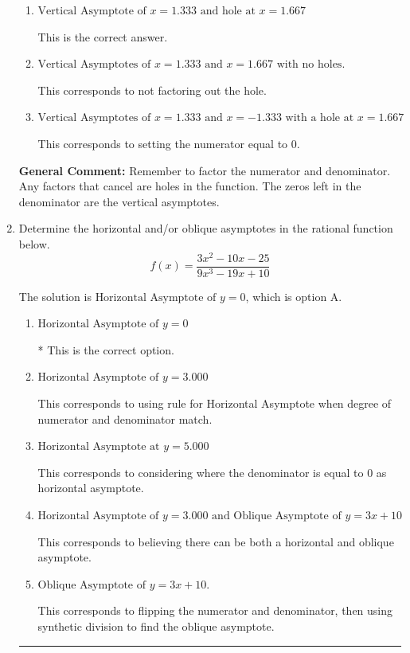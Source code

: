\documentclass{extbook}[14pt]
\newcommand{\litem}[1]{\item #1

\rule{\textwidth}{0.4pt}}
\begin{document}
\begin{enumerate}
{\begin{enumerate}[label=\Alph*.]
This corresponds to considering where the denominator is equal to 0 as holes.
\item \( \text{Vertical Asymptote of } x = 1.333 \text{ and hole at } x = 1.667 \)

This is the correct answer.
\item \( \text{Vertical Asymptotes of } x = 1.333 \text{ and } x = 1.667 \text{ with no holes.} \)

This corresponds to not factoring out the hole.
\item \( \text{Vertical Asymptotes of } x = 1.333 \text{ and } x = -1.333 \text{ with a hole at } x = 1.667 \)

This corresponds to setting the numerator equal to 0.
\end{enumerate}

\textbf{General Comment:} Remember to factor the numerator and denominator. Any factors that cancel are holes in the function. The zeros left in the denominator are the vertical asymptotes.
}
\litem{
Determine the horizontal and/or oblique asymptotes in the rational function below.
\[ f(x) = \frac{3x^{2} -10 x -25}{9x^{3} -19 x + 10} \]

The solution is \( \text{Horizontal Asymptote of } y = 0 \), which is option A.\begin{enumerate}[label=\Alph*.]
\item \( \text{Horizontal Asymptote of } y = 0 \)

* This is the correct option.
\item \( \text{Horizontal Asymptote of } y = 3.000  \)

This corresponds to using rule for Horizontal Asymptote when degree of numerator and denominator match.
\item \( \text{Horizontal Asymptote at } y = 5.000 \)

This corresponds to considering where the denominator is equal to 0 as horizontal asymptote.
\item \( \text{Horizontal Asymptote of } y = 3.000 \text{ and Oblique Asymptote of } y = 3x + 10 \)

This corresponds to believing there can be both a horizontal and oblique asymptote.
\item \( \text{Oblique Asymptote of } y = 3x + 10. \)

This corresponds to flipping the numerator and denominator, then using synthetic division to find the oblique asymptote.
\end{enumerate}

}
\end{enumerate}
\end{document}
